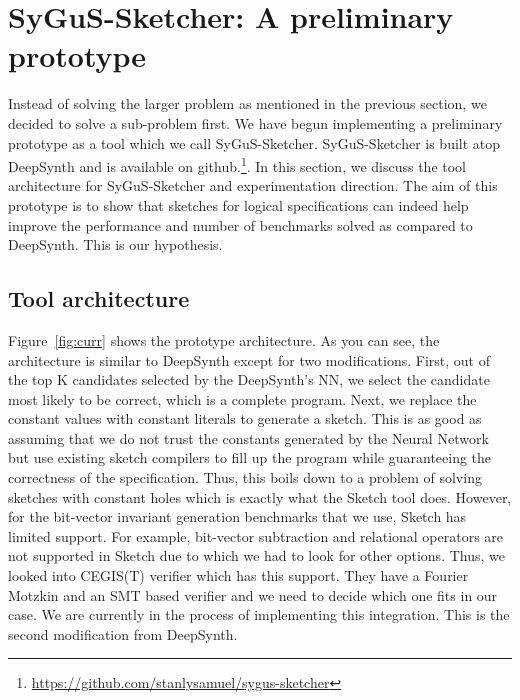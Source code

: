 \section{SyGuS-Sketcher: A preliminary prototype}

Instead of solving the larger problem as mentioned in the previous section, we decided to solve a sub-problem first.
We have begun implementing a preliminary prototype as a tool which we call SyGuS-Sketcher. SyGuS-Sketcher is built atop DeepSynth \cite{polgreen2020counterexample} and is available on github.\footnote{\url{https://github.com/stanlysamuel/sygus-sketcher}}. In this section, we discuss the tool architecture for SyGuS-Sketcher  and experimentation direction. The aim of this prototype is to show that sketches for logical specifications can indeed help improve the performance and number of benchmarks solved as compared to DeepSynth. This is our hypothesis.

\subsection{Tool architecture}

Figure~\ref{fig:curr} shows the prototype architecture. As you can see, the architecture is similar to DeepSynth except for two modifications. First, out of the top K candidates selected by the DeepSynth's NN, we select the candidate most likely to be correct, which is a complete program. Next, we replace the constant values with constant literals to generate a sketch. This is as good as assuming that we do not trust the constants generated by the Neural Network but use existing sketch compilers to fill up the program while guaranteeing the correctness of the specification. Thus, this boils down to a problem of solving sketches with constant holes which is exactly what the Sketch tool\cite{10.5555/1714168} does. However, for the bit-vector invariant generation benchmarks that we use, Sketch has limited support. For example, bit-vector subtraction and relational operators are not supported in Sketch due to which we had to look for other options. Thus, we looked into CEGIS(T) verifier which has this support. They have a Fourier Motzkin and an SMT based verifier and we need to decide which one fits in our case. We are currently in the process of implementing this integration. This is the second modification from DeepSynth.




